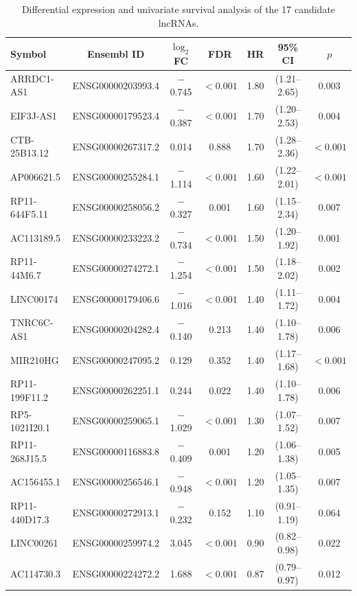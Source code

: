 \documentclass[12pt,a4paper]{article}
\begin{document}
\begin{table}[htp]
\centering
\caption{Differential expression and univariate survival analysis of the 17 candidate lncRNAs.}
\small
\begin{tabular}{lcccccc}
\toprule
\textbf{Symbol} & \textbf{Ensembl ID} & \textbf{$\log_{2}$FC} & \textbf{FDR} & \textbf{HR} & \textbf{95\% CI} & \textbf{$p$} \\
\midrule
ARRDC1-AS1 & ENSG00000203993.4 & $-$0.745 & $<0.001$ & 1.80 & (1.21--2.65) & 0.003 \\
EIF3J-AS1 & ENSG00000179523.4 & $-$0.387 & $<0.001$ & 1.70 & (1.20--2.53) & 0.004 \\
CTB-25B13.12 & ENSG00000267317.2 & 0.014 & 0.888 & 1.70 & (1.28--2.36) & $<0.001$ \\
AP006621.5 & ENSG00000255284.1 & $-$1.114 & $<0.001$ & 1.60 & (1.22--2.01) & $<0.001$ \\
RP11-644F5.11 & ENSG00000258056.2 & $-$0.327 & 0.001 & 1.60 & (1.15--2.34) & 0.007 \\
AC113189.5 & ENSG00000233223.2 & $-$0.734 & $<0.001$ & 1.50 & (1.20--1.92) & 0.001 \\
RP11-44M6.7 & ENSG00000274272.1 & $-$1.254 & $<0.001$ & 1.50 & (1.18--2.02) & 0.002 \\
LINC00174 & ENSG00000179406.6 & $-$1.016 & $<0.001$ & 1.40 & (1.11--1.72) & 0.004 \\
TNRC6C-AS1 & ENSG00000204282.4 & $-$0.140 & 0.213 & 1.40 & (1.10--1.78) & 0.006 \\
MIR210HG & ENSG00000247095.2 & 0.129 & 0.352 & 1.40 & (1.17--1.68) & $<0.001$ \\
RP11-199F11.2 & ENSG00000262251.1 & 0.244 & 0.022 & 1.40 & (1.10--1.78) & 0.006 \\
RP5-1021I20.1 & ENSG00000259065.1 & $-$1.029 & $<0.001$ & 1.30 & (1.07--1.52) & 0.007 \\
RP11-268J15.5 & ENSG00000116883.8 & $-$0.409 & 0.001 & 1.20 & (1.06--1.38) & 0.005 \\
AC156455.1 & ENSG00000256546.1 & $-$0.948 & $<0.001$ & 1.20 & (1.05--1.35) & 0.007 \\
RP11-440D17.3 & ENSG00000272913.1 & $-$0.232 & 0.152 & 1.10 & (0.91--1.19) & 0.064 \\
LINC00261 & ENSG00000259974.2 & 3.045 & $<0.001$ & 0.90 & (0.82--0.98) & 0.022 \\
AC114730.3 & ENSG00000224272.2 & 1.688 & $<0.001$ & 0.87 & (0.79--0.97) & 0.012 \\
\bottomrule
\end{tabular}
\label{tab1}
\end{table}
\end{document}

